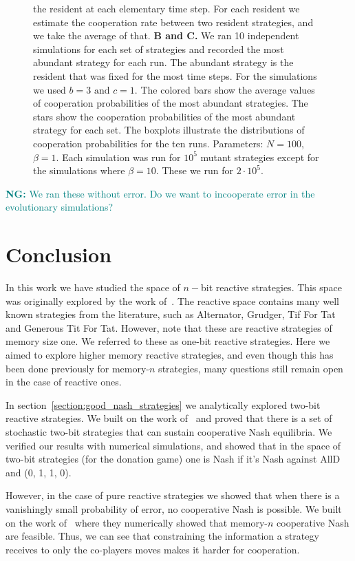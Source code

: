 \documentclass{article}
\theoremstyle{definition}
\newcommand{\nikoleta}[1]{\textcolor{teal}{{\bf NG:} #1}}
\begin{document}
\begin{figure}[htbp]
{  the resident at each elementary time step. For each resident we estimate the
  cooperation rate between two resident strategies, and we take the average of
  that. 
  \textbf{B and C.} We ran 10 independent simulations for each set of strategies
  and recorded the most abundant strategy for each run. The abundant strategy is
  the resident that was fixed for the most time steps. For the simulations we
  used \(b=3 \text{ and } c=1\). The colored bars show the average values of
  cooperation probabilities of the most abundant strategies. The stars show the
  cooperation probabilities of the most abundant strategy for each set. The
  boxplots illustrate the distributions of cooperation probabilities for the ten
  runs.
  Parameters: \(N=100\), \(\beta=1\). Each simulation was run for \(10 ^ {5}\)
  mutant strategies except for the simulations where \(\beta=10\). These we
  run for \(2 \cdot 10 ^ {5}\).}\label{fig:three_graphs}
\end{figure}

\nikoleta{We ran these without error. Do we want to incooperate error in the
evolutionary simulations?}

\section{Conclusion}

In this work we have studied the space of \(n-\)bit reactive strategies. This
space was originally explored by the work of~\citep{nowak:AAM:1990}. The
reactive space contains many well known strategies from the literature, such as
Alternator, Grudger, Tif For Tat and Generous Tit For Tat. However, note that
these are reactive strategies of memory size one. We referred to these as
one-bit reactive strategies. Here we aimed to explore higher memory reactive
strategies, and even though this has been done previously for memory-\(n\)
strategies, many questions still remain open in the case of reactive ones.

In section~\ref{section:good_nash_strategies} we analytically explored two-bit
reactive strategies. We built on the work of~\citep{akin:EGADS:2016} and proved
that there is a set of stochastic two-bit strategies that can sustain
cooperative Nash equilibria. We verified our results with numerical simulations,
and showed that in the space of two-bit strategies (for the donation game) one
is Nash if it's Nash against AllD and (0, 1, 1, 0).

However, in the case of pure reactive strategies we showed that when there is a
vanishingly small probability of error, no cooperative Nash is possible. We
built on the work of~\citep{hilbe:PNAS:2017} where they numerically showed that
memory-\(n\) cooperative Nash are feasible. Thus, we can see that constraining
the information a strategy receives to only the co-players moves makes it harder
for cooperation.
\end{document}
